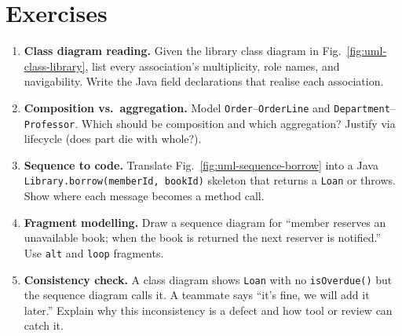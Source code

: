 \section{Exercises}
\label{sec:ch04-exercises}
\begin{enumerate}[label=E4.\arabic*, leftmargin=*, itemsep=0.8em]
    \item \textbf{Class diagram reading.} Given the library class diagram in Fig.~\ref{fig:uml-class-library}, list every association's multiplicity, role names, and navigability. Write the Java field declarations that realise each association.
    \item \textbf{Composition vs.\ aggregation.} Model \texttt{Order}--\texttt{OrderLine} and \texttt{Department}--\texttt{Professor}. Which should be composition and which aggregation? Justify via lifecycle (does part die with whole?).
    \item \textbf{Sequence to code.} Translate Fig.~\ref{fig:uml-sequence-borrow} into a Java \texttt{Library.borrow(memberId, bookId)} skeleton that returns a \texttt{Loan} or throws. Show where each message becomes a method call.
    \item \textbf{Fragment modelling.} Draw a sequence diagram for ``member reserves an unavailable book; when the book is returned the next reserver is notified.'' Use \texttt{alt} and \texttt{loop} fragments.
    \item \textbf{Consistency check.} A class diagram shows \texttt{Loan} with no \texttt{isOverdue()} but the sequence diagram calls it. A teammate says ``it's fine, we will add it later.'' Explain why this inconsistency is a defect and how tool or review can catch it.
\end{enumerate}

